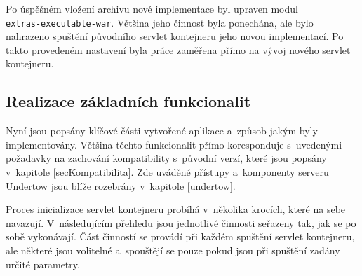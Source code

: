             Po úspěšném vložení archivu nové implementace byl upraven modul \\\texttt{extras-executable-war}.
            Většina jeho činnost byla ponechána, ale bylo nahrazeno spuštění původního servlet kontejneru
            jeho novou implementací. Po takto provedeném nastavení byla práce zaměřena přímo na vývoj
            nového servlet kontejneru. 

        


        \subsection{Realizace základních funkcionalit}
            Nyní jsou popsány klíčové části vytvořené aplikace a~způsob jakým byly implementovány. Většina těchto
            funkcionalit přímo koresponduje s~uvedenými požadavky na zachování kompatibility s~původní verzí, 
            které jsou popsány v~kapitole \ref{secKompatibilita}.
            Zde uváděné přístupy a~komponenty serveru Undertow jsou blíže rozebrány v~kapitole \ref{undertow}.

            Proces inicializace servlet kontejneru probíhá v~několika krocích, které na sebe
            navazují. V~následujícím přehledu jsou jednotlivé činnosti seřazeny tak, jak
            se po sobě vykonávají. 
            Část činností se provádí při každém spuštění servlet kontejneru,
            ale některé jsou volitelné a~spouštějí se pouze pokud jsou při spuštění
            zadány určité parametry. 

